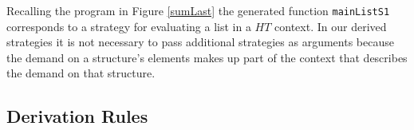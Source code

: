 Recalling the program in Figure \ref{sumLast} the generated function
\verb-mainListS1- corresponds to a strategy for evaluating a list in a
$HT$ context. In our derived strategies it is not necessary to pass
additional strategies as arguments because the demand on a structure's elements
makes up part of the context that describes the demand on that structure.

\subsection*{Derivation Rules}


